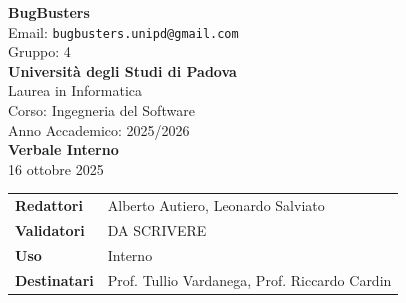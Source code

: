 \documentclass[a4paper,12pt]{article}
\begin{document}
\begin{center}  
  
  {\Large\bfseries\color{primaryblue} BugBusters}\\[0.3cm]
  {\small\color{darkgray} Email: \texttt{bugbusters.unipd@gmail.com}} \\[0.1cm]
  {\small\color{darkgray} Gruppo: 4} \\[0.5cm]

  {\large\bfseries Università degli Studi di Padova}\\[0.3cm]
  {\small Laurea in Informatica}\\[0.2cm]
  {\small Corso: Ingegneria del Software}\\[0.2cm]
  {\small Anno Accademico: 2025/2026}\\[0.8cm]

  {\Huge\bfseries\color{primaryblue} Verbale Interno}\\[0.3cm]
  {\Large\color{secondaryblue} 16 ottobre 2025}\\[0.8cm]
\end{center}

\begin{center}
\begin{tcolorbox}[colback=lightgray,colframe=primaryblue,width=0.85\textwidth,arc=3mm,boxrule=0.5pt]
\begin{tabular}{@{}ll@{}}
\textbf{Redattori}    & Alberto Autiero, Leonardo Salviato \\
\textbf{Validatori}    & DA SCRIVERE \\
\textbf{Uso}          & Interno \\
\textbf{Destinatari}  & Prof. Tullio Vardanega, Prof. Riccardo Cardin \\
\end{tabular}
\end{tcolorbox}
\end{center}
\end{document}
